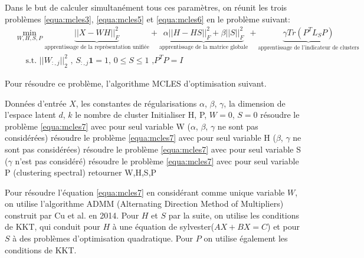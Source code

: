 \documentclass[12pt, french, latin.medieval, a4paper]{report}
\begin{document}
    Dans le but de calculer simultanément tous ces paramètres, on réunit les trois problèmes \ref{equa:mcles3}, \ref{equa:mcles5} et \ref{equa:mcles6} en le problème suivant:
    \begin{equation}
   	 \begin{split}
   		 & \min_{W,H,S,P}  \underbrace{ {|| X - WH ||}_F^2 }_{\text{apprentissage de la représentation unifiée}}  + \underbrace{ \alpha{|| H - HS ||}_F^2 + \beta {|| S ||}_F^2 }_{\text{apprentissage de la matrice globale}} + \underbrace{ \gamma Tr(P^TL_SP) }_{\text{apprentissage de l'indicateur de clusters}}
        	\\
   		 &\quad \text{  s.t. ${|| W_{:,j} ||}_2^2$ , }
   		 \text{$S_{:,j}\textbf{1}=1$, $0\leq S \leq1$ ,}
   		 \text{$P^TP =I$}
   	 \end{split}
   	 \label{equa:mcles7}
    \end{equation}

    Pour résoudre ce problème, l'algorithme MCLES d'optimisation suivant.
   	 \begin{algorithm}[H]
   		 \caption{Algorithme d'optimisation MCLES \cite{mcles}}
   		 \label{alg:mcles1}
   		 \begin{algorithmic}[1]
   		 \REQUIRE Données d'entrée $X$, les constantes de régularisations $\alpha$, $\beta$, $\gamma$, la dimension de l'espace latent $d$, $k$ le nombre de cluster
   		 \STATE Initialiser H, P, $W = 0$, $S = 0$
   		 \REPEAT
       		 \STATE résoudre le problème \ref{equa:mcles7} avec pour seul variable W ($\alpha$, $\beta$, $\gamma$ ne sont pas considérées)
       		 \STATE résoudre le problème \ref{equa:mcles7} avec pour seul variable H ($\beta$, $\gamma$ ne sont pas considérées)
       		 \STATE résoudre le problème \ref{equa:mcles7} avec pour seul variable S ($\gamma$ n'est pas considéré)
       		 \STATE résoudre le problème \ref{equa:mcles7} avec pour seul variable P (clustering spectral)
   		 \STATE retourner W,H,S,P
   		 \end{algorithmic}
   	 \end{algorithm}

    Pour résoudre l'équation \ref{equa:mcles7} en considérant comme unique variable $W$, on utilise l'algorithme ADMM (Alternating Direction Method of Multipliers) construit par Cu et al. en 2014.
    Pour $H$ et $S$ par la suite, on utilise les conditions de KKT, qui conduit pour $H$ à une équation de sylvester($AX+BX=C$) et pour $S$ à des problèmes d'optimisation quadratique.
    Pour $P$ on utilise également les conditions de KKT.
\end{document}
